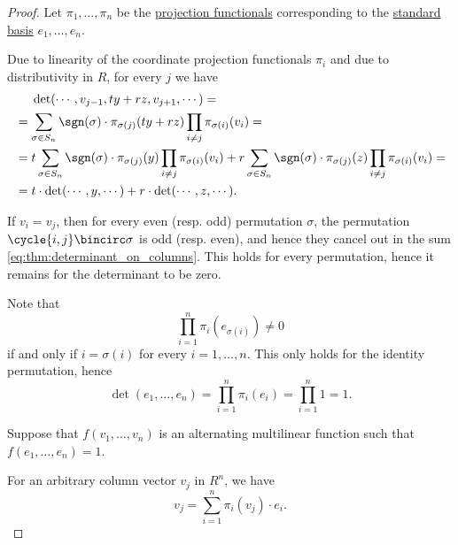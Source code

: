 \begin{proof}
  Let \( \pi_1, \ldots, \pi_n \) be the \hyperref[def:basis_decomposition]{projection functionals} corresponding to the \hyperref[def:coordinate_space]{standard basis} \( e_1, \ldots, e_n \).

   Due to linearity of the coordinate projection functionals \( \pi_i \) and due to distributivity in \( R \), for every \( j \) we have
  \begin{align*}
    &\phantom{{}={}}
    \det(\cdots, v_{j-1}, ty + rz, v_{j+1}, \cdots)
    = \\ &=
    \sum_{\sigma \in S_n} \sgn(\sigma) \cdot \pi_{\sigma(j)} (ty + rz) \prod_{i \neq j} \pi_{\sigma(i)} (v_i)
    = \\ &=
    t \sum_{\sigma \in S_n} \sgn(\sigma) \cdot \pi_{\sigma(j)} (y) \prod_{i \neq j} \pi_{\sigma(i)} (v_i) + r \sum_{\sigma \in S_n} \sgn(\sigma) \cdot \pi_{\sigma(j)} (z) \prod_{i \neq j} \pi_{\sigma(i)} (v_i)
    = \\ &=
    t \cdot \det(\cdots, y, \cdots) + r \cdot \det(\cdots, z, \cdots).
  \end{align*}

   If \( v_i = v_j \), then for every even (resp. odd) permutation \( \sigma \), the permutation \( \cycle{i, j} \bincirc \sigma \) is odd (resp. even), and hence they cancel out in the sum \eqref{eq:thm:determinant_on_columns}. This holds for every permutation, hence it remains for the determinant to be zero.

   Note that
  \begin{equation*}
    \prod_{i=1}^n \pi_i (e_{\sigma(i)}) \neq 0
  \end{equation*}
  if and only if \( i = \sigma(i) \) for every \( i = 1, \ldots, n \). This only holds for the identity permutation, hence
  \begin{equation*}
    \det(e_1, \ldots, e_n) = \prod_{i=1}^n \pi_i(e_i) = \prod_{i=1}^n 1 = 1.
  \end{equation*}

  \UniquenessSubProof Suppose that \( f(v_1, \ldots, v_n) \) is an alternating multilinear function such that \( f(e_1, \ldots, e_n) = 1 \).

  For an arbitrary column vector \( v_j \) in \( R^n \), we have
  \begin{equation*}
    v_j = \sum_{i=1}^n \pi_i(v_j) \cdot e_i.
  \end{equation*}


\end{proof}
